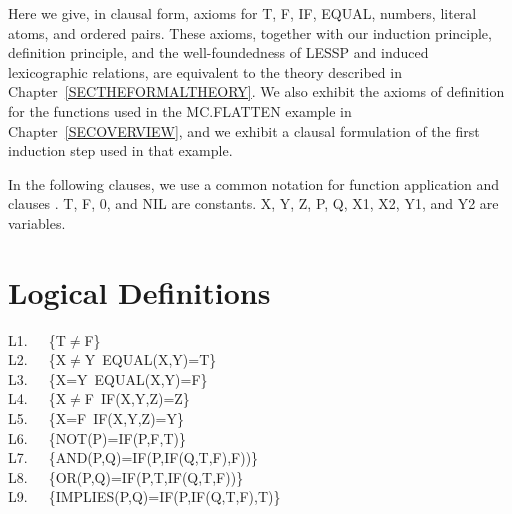 \documentclass[11pt]{book}
\newenvironment{pubasis}{\begin{flushleft}\ttfamily\small}{\normalsize\rmfamily\end{flushleft}}
\newcommand{\pubdefaulttextsize}{\large}
\begin{document}
Here we give, in clausal form,  axioms for T, F, IF, EQUAL, numbers, literal
atoms, and ordered pairs.  These axioms, together with our induction principle,
definition principle, and the well-foundedness of LESSP and induced
lexicographic relations, are equivalent to the theory described
in Chapter~\ref{SECTHEFORMALTHEORY}.  We also exhibit the axioms of definition for
the functions used in the MC.FLATTEN example in Chapter~\ref{SECOVERVIEW},
and we exhibit a clausal formulation of the first induction step used in
that example.

In the following clauses, we use a common notation for function
application and clauses \cite{ROBINSON}.  T, F, 0, and NIL
are
constants.  X, Y, Z, P, Q, X1, X2, Y1, and Y2 are
variables.
\section{Logical Definitions}
\pubdefaulttextsize
\begin{pubasis}
L1.~~~\{T$\neq$F\}\\

L2.~~~\{X$\neq$Y~EQUAL(X,Y)=T\}\\

L3.~~~\{X=Y~EQUAL(X,Y)=F\}\\

L4.~~~\{X$\neq$F~IF(X,Y,Z)=Z\}\\

L5.~~~\{X=F~IF(X,Y,Z)=Y\}\\

L6.~~~\{NOT(P)=IF(P,F,T)\}\\

L7.~~~\{AND(P,Q)=IF(P,IF(Q,T,F),F))\}\\

L8.~~~\{OR(P,Q)=IF(P,T,IF(Q,T,F))\}\\

L9.~~~\{IMPLIES(P,Q)=IF(P,IF(Q,T,F),T)\}\\
\end{pubasis}
\end{document}
